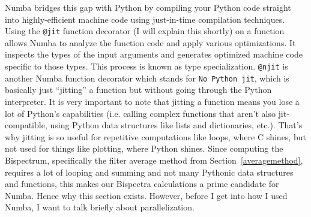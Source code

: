 \documentclass[11pt]{article}
\renewcommand{\_}[1]{\underline{ #1 }}
\newcommand{\npar}{\vspace{.3cm}\newline}
\begin{document}
{Numba bridges this gap with Python by compiling your Python code straight into highly-efficient machine code using just-in-time compilation techniques. Using the \texttt{@jit} function decorator (I will explain this shortly) on a function allows Numba to analyze the function code and apply various optimizations. It inspects the types of the input arguments and generates optimized machine code specific to those types. This process is known as type specialization. \texttt{@njit} is another Numba function decorator which stands for \texttt{No Python jit}, which is basically just ``jitting'' a function but without going through the Python interpreter. It is very important to note that jitting a function means you lose a lot of Python's capabilities (i.e. calling complex functions that aren't also jit-compatible, using Python data structures like lists and dictionaries, etc.). That's why jitting is so useful for repetitive computations like loops, where C shines, but not used for things like plotting, where Python shines. Since computing the Bispectrum, specifically the filter average method from Section~\ref{averagemethod}, requires a lot of looping and summing and not many Pythonic data structures and functions, this makes our Bispectra calculations a prime candidate for Numba. Hence why this section exists. However, before I get into how I used Numba, I want to talk briefly about parallelization.
\npar
}
\end{document}
